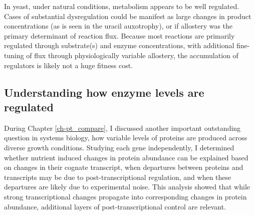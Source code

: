 In yeast, under natural conditions, metabolism appears to be well regulated. Cases of substantial dysregulation could be manifest as large changes in product concentrations (as is seen in the uracil auxotrophy), or if allostery was the primary determinant of reaction flux. Because most reactions are primarily regulated through substrate(s) and enzyme concentrations, with additional fine-tuning of flux through physiologically variable allostery, the accumulation of regulators is likely not a huge fitness cost.

\subsection{Understanding how enzyme levels are regulated}

During Chapter \ref{ch-pt_compare}, I discussed another important outstanding question in systems biology, how variable levels of proteins are produced across diverse growth conditions. Studying each gene independently, I determined whether nutrient induced changes in protein abundance can be explained based on changes in their cognate transcript, when departures between proteins and transcripts may be due to post-transcriptional regulation, and when these departures are likely due to experimental noise. This analysis showed that while strong transcriptional changes propagate into corresponding changes in protein abundance, additional layers of post-transcriptional control are relevant.
